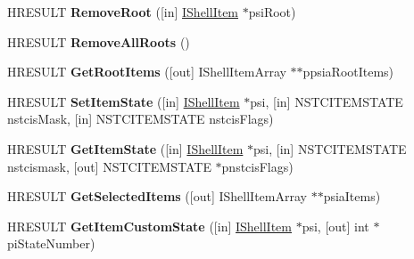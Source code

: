 \begin{DoxyCompactItemize}
\item 
\mbox{\label{interface_i_name_space_tree_control_a201bcb20b9ad10accc2d3c2d736cc29c}} 
H\+R\+E\+S\+U\+LT {\bfseries Remove\+Root} (\mbox{[}in\mbox{]} \hyperlink{interface_i_shell_item}{I\+Shell\+Item} $\ast$psi\+Root)
\item 
\mbox{\label{interface_i_name_space_tree_control_a23c1858024c3a5613c8c80ebeba00fdd}} 
H\+R\+E\+S\+U\+LT {\bfseries Remove\+All\+Roots} ()
\item 
\mbox{\label{interface_i_name_space_tree_control_a3f94ae5722943ebd3d5ffff6b28f7b86}} 
H\+R\+E\+S\+U\+LT {\bfseries Get\+Root\+Items} (\mbox{[}out\mbox{]} I\+Shell\+Item\+Array $\ast$$\ast$ppsia\+Root\+Items)
\item 
\mbox{\label{interface_i_name_space_tree_control_a6edcf47cdd8670972f0ee684bda38680}} 
H\+R\+E\+S\+U\+LT {\bfseries Set\+Item\+State} (\mbox{[}in\mbox{]} \hyperlink{interface_i_shell_item}{I\+Shell\+Item} $\ast$psi, \mbox{[}in\mbox{]} N\+S\+T\+C\+I\+T\+E\+M\+S\+T\+A\+TE nstcis\+Mask, \mbox{[}in\mbox{]} N\+S\+T\+C\+I\+T\+E\+M\+S\+T\+A\+TE nstcis\+Flags)
\item 
\mbox{\label{interface_i_name_space_tree_control_a21238a5ce39634cf8312b56d39746e13}} 
H\+R\+E\+S\+U\+LT {\bfseries Get\+Item\+State} (\mbox{[}in\mbox{]} \hyperlink{interface_i_shell_item}{I\+Shell\+Item} $\ast$psi, \mbox{[}in\mbox{]} N\+S\+T\+C\+I\+T\+E\+M\+S\+T\+A\+TE nstcismask, \mbox{[}out\mbox{]} N\+S\+T\+C\+I\+T\+E\+M\+S\+T\+A\+TE $\ast$pnstcis\+Flags)
\item 
\mbox{\label{interface_i_name_space_tree_control_a68ed9e92525fb3933f5dcfda776dd8e6}} 
H\+R\+E\+S\+U\+LT {\bfseries Get\+Selected\+Items} (\mbox{[}out\mbox{]} I\+Shell\+Item\+Array $\ast$$\ast$psia\+Items)
\item 
\mbox{\label{interface_i_name_space_tree_control_a8beb8e1da22605aef5d3594f6e7d4af9}} 
H\+R\+E\+S\+U\+LT {\bfseries Get\+Item\+Custom\+State} (\mbox{[}in\mbox{]} \hyperlink{interface_i_shell_item}{I\+Shell\+Item} $\ast$psi, \mbox{[}out\mbox{]} int $\ast$pi\+State\+Number)

\end{DoxyCompactItemize}
